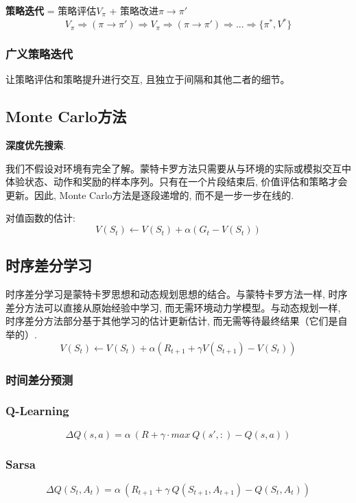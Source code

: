 \documentclass{article}
\begin{document}
            \textbf{策略迭代} = 策略评估$V_{\pi}$ + 策略改进$\pi \to \pi'$
                $$V_{\pi} \Rightarrow (\pi \to \pi') \Rightarrow V_{\pi} \Rightarrow (\pi \to \pi') \Rightarrow ... \Rightarrow \{\pi^*, V^*\}$$
        
        \subsubsection{广义策略迭代}
            让策略评估和策略提升进行交互, 且独立于间隔和其他二者的细节。
    
    \subsection{Monte Carlo方法}
        \textbf{深度优先搜索}.
    
        我们不假设对环境有完全了解。蒙特卡罗方法只需要从与环境的实际或模拟交互中体验状态、动作和奖励的样本序列。只有在一个片段结束后, 价值评估和策略才会更新。因此, Monte Carlo方法是逐段递增的, 而不是一步一步在线的.
        
        对值函数的估计:
            $$V\left(S_{t}\right) \leftarrow V\left(S_{t}\right)+\alpha\left(G_{t}-V\left(S_{t}\right)\right)$$

    \subsection{时序差分学习}
        时序差分学习是蒙特卡罗思想和动态规划思想的结合。与蒙特卡罗方法一样, 时序差分方法可以直接从原始经验中学习, 而无需环境动力学模型。与动态规划一样, 时序差分方法部分基于其他学习的估计更新估计, 而无需等待最终结果（它们是自举的）.
            $$V\left(S_{t}\right) \leftarrow V\left(S_{t}\right)+\alpha\left(R_{t+1}+\gamma V\left(S_{t+1}\right)-V\left(S_{t}\right)\right)$$
        
        \subsubsection{时间差分预测}
    
    	\subsubsection{Q-Learning}
    	    $$\Delta Q(s,a) = \alpha\ ( R + \gamma \cdot max\ Q(s',:) - Q(s,a))$$
    	    
    	\subsubsection{Sarsa}
    	    $$\Delta Q(S_{t},A_{t}) = \alpha\ ( R_{t+1} + \gamma\ Q(S_{t+1}, A_{t+1}) - Q(S_t, A_t))$$
    	
\end{document}
